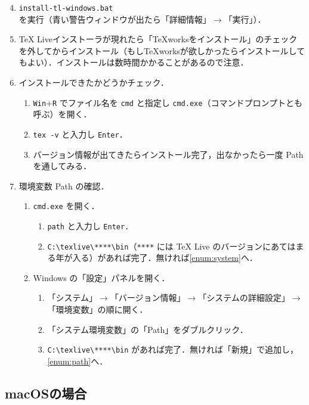 \begin{enumerate}
    \setcounter{enumi}{3}
    \item \verb|install-tl-windows.bat| を実行（青い警告ウィンドウが出たら「詳細情報」$\to$「実行」）．\label{enum:bat}
    \item TeX Liveインストーラが現れたら「TeXworksをインストール」のチェックを外してからインストール（もしTeXworksが欲しかったらインストールしてもよい）．インストールは数時間かかることがあるので注意．
    \item インストールできたかどうかチェック．
    \begin{enumerate}
        \item \verb|Win|$+$\verb|R| でファイル名を \verb|cmd| と指定し \verb|cmd.exe|（コマンドプロンプトとも呼ぶ）を開く．
        \item \verb|tex -v| と入力し \verb|Enter|．
        \item バージョン情報が出てきたらインストール完了，出なかったら一度 Path を通してみる．
    \end{enumerate}
    \item 環境変数 Path の確認．
    \begin{enumerate}
        \item \verb|cmd.exe| を開く．\label{enum:path}
        \begin{enumerate}
            \item \verb|path| と入力し \verb|Enter|．
            \item \verb|C:\texlive\****\bin|（\verb|****| には TeX Live のバージョンにあてはまる年が入る）があれば完了．無ければ\ref{enum:system}へ．
        \end{enumerate}
        \item Windows の「設定」パネルを開く．\label{enum:system}
        \begin{enumerate}
            \item 「システム」$\to$「バージョン情報」$\to$「システムの詳細設定」$\to$「環境変数」の順に開く．
            \item 「システム環境変数」の「Path」をダブルクリック．
            \item \verb|C:\texlive\****\bin| があれば完了．無ければ「新規」で追加し，\ref{enum:path}へ．
        \end{enumerate}
    \end{enumerate}
\end{enumerate}

\subsection{macOSの場合}
\label{ssec:mac}

